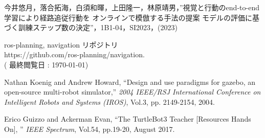 \documentclass{jarticle}
\begin{document}
\begin{thebibliography}{99}
今井悠月，落合拓海，白須和暉，上田隆一，林原靖男，”視覚と行動のend-to-end 学習により経路追従行動を
オンラインで模倣する手法の提案 モデルの評価に基づく訓練ステップ数の決定”，1B1-04，SI2023，(2023)

ros-planning, navigation リポジトリ\\
https://github.com/ros-planning/navigation.\\
( 最終閲覧日 : \today )

Nathan Koenig and Andrew Howard, “Design and use paradigms for gazebo, an
open-source multi-robot simulator,” \textit{2004 IEEE/RSJ International Conference
on Intelligent Robots and Systems (IROS)}, Vol.3, pp.
2149-2154, 2004.

Erico Guizzo and Ackerman Evan, “The TurtleBot3 Teacher [Resources Hands On],
” \textit{IEEE Spectrum}, Vol.54, pp.19-20, August 2017.


\end{thebibliography}

\normalsize
\end{document}
